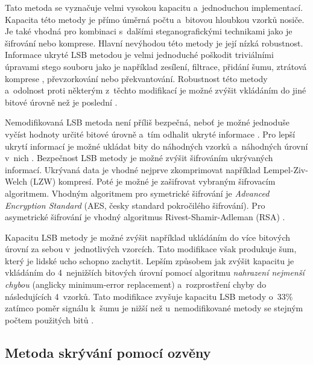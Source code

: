Tato metoda se vyznačuje velmi vysokou kapacitu \cite{Djebbar2012}
a~jednoduchou implementací. Kapacita této metody je přímo úměrná počtu
a~bitovou hloubkou vzorků nosiče. Je také vhodná pro kombinaci s~dalšími
steganografickými technikami \cite{Djebbar2012} jako je šifrování nebo
komprese. Hlavní nevýhodou této metody je její nízká robustnost. Informace
ukryté LSB metodou je velmi jednoduché poškodit triviálními úpravami stego
souboru jako je například zesílení, filtrace, přidání šumu, ztrátová komprese
\cite{Djebbar2012}, převzorkování nebo překvantování. Robustnost této metody
a~odolnost proti některým z~těchto modifikací je možné zvýšit vkládáním do jiné
bitové úrovně než je poslední \cite{Djebbar2012}.

Nemodifikovaná LSB metoda není příliš bezpečná, neboť je možné jednoduše vyčíst
hodnoty určité bitové úrovně a~tím odhalit ukryté informace \cite{Djebbar2012}.
Pro lepší ukrytí informací je možné ukládat bity do náhodných vzorků
a~náhodných úrovní v~nich \cite{Dutta2020}. Bezpečnost LSB metody je možné
zvýšit šifrováním ukrývaných informací. Ukrývaná data je vhodné nejprve
zkomprimovat například Lempel-Ziv-Welch (LZW) kompresí. Poté je možné je
zašifrovat vybraným šifrovacím algoritmem. Vhodným algoritmem pro symetrické
šifrování je \textit{Advanced Encryption Standard} (AES, česky standard
pokročilého šifrování). Pro asymetrické šifrování je vhodný algoritmus
Rivest-Shamir-Adleman (RSA) \cite{Dutta2020}.

Kapacitu LSB metody je možné zvýšit například ukládáním do více bitových úrovní
za sebou v~jednotlivých vzorcích. Tato modifikace však produkuje šum, který je
lidské ucho schopno zachytit. Lepším způsobem jak zvýšit kapacitu je vkládáním
do 4~nejnižších bitových úrovní pomocí algoritmu \textit{nahrazení nejmenší
chybou} (anglicky minimum-error replacement) a~rozprostření chyby do
následujících 4~vzorků. Tato modifikace zvyšuje kapacitu LSB metody o~33\%
zatímco poměr signálu k~šumu je nižší než u~nemodifikované metody se stejným
počtem použitých bitů \cite{Cvejic2002}.

\subsection*{Metoda skrývání pomocí ozvěny}
\label{sub:echo-hiding}

